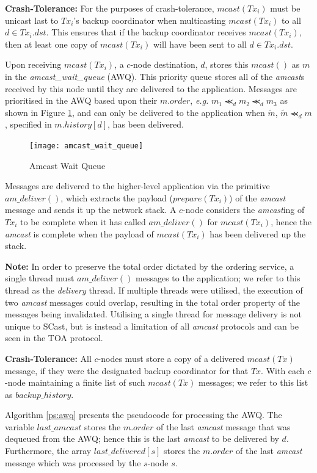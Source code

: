 \begin{enumerate}
        \textbf{Crash-Tolerance:} For the purposes of crash-tolerance, $mcast(Tx_i)$ must be unicast last to $Tx_i$'s backup coordinator when multicasting $mcast(Tx_i)$ to all $d \in Tx_i.dst$.  This ensures that if the backup coordinator receives $mcast(Tx_i)$, then at least one copy of $mcast(Tx_i)$ will have been sent to all $d \in Tx_i.dst$.  
        \endleftbar
        
        \leftbar
        Upon receiving $mcast(Tx_i)$, a $c$-node destination, $d$, stores this $mcast()$ as $m$ in the \emph{amcast\_wait\_queue} (AWQ).  This priority queue stores all of the \emph{amcast}s received by this node until they are delivered to the application.  Messages are prioritised in the AWQ based upon their $m.order$, \emph{e.g.} $m_1 \llcurly_d m_2 \llcurly_d m_3$ as shown in Figure \ref{fig:awq}, and can only be delivered to the application when $\tilde{m}$, $\tilde{m} \llcurly_d m$, specified in $m.history[d]$, has been delivered.  
        
         \begin{figure}[H] 
        \centering    
         \texttt{[image: amcast\_wait\_queue]}
         \caption[Amcast Wait Queue]{Amcast Wait Queue}
         \label{fig:awq}
    \end{figure}             
        \vspace{-2em}
        Messages are delivered to the higher-level application via the primitive $am\_deliver()$, which extracts the payload ($prepare(Tx_i)$) of the \emph{amcast} message and sends it up the network stack.  A $c$-node considers the \emph{amcast}ing of $Tx_i$ to be complete when it has called $am\_deliver()$ for $mcast(Tx_i)$, hence the \emph{amcast} is complete when the payload of $mcast(Tx_i)$ has been delivered up the stack.  
        
        \textbf{Note:} In order to preserve the total order dictated by the ordering service, a single thread must $am\_deliver()$ messages to the application; we refer to this thread as the \emph{delivery} thread.  If multiple threads were utilised, the execution of two \emph{amcast} messages could overlap, resulting in the total order property of the messages being invalidated.  Utilising a single thread for message delivery is not unique to \textsf{SCast}, but is instead a limitation of all \emph{amcast} protocols and can be seen in the TOA protocol.    
        
        \textbf{Crash-Tolerance:} All $c$-nodes must store a copy of a delivered $mcast(Tx)$ message, if they were the designated backup coordinator for that $Tx$.  With each $c$-node maintaining a finite list of such $mcast(Tx)$ messages; we refer to this list as $backup\_history$.  
        \endleftbar

        Algorithm \ref{ps:awq} presents the pseudocode for processing the AWQ.  The variable $last\_amcast$ stores the $m.order$ of the last \emph{amcast} message that was dequeued from the AWQ; hence this is the last \emph{amcast} to be delivered by $d$.  Furthermore, the array $last\_delivered[s]$ stores the $m.order$ of the last \emph{amcast} message which was processed by the $s$-node $s$.  
    
    \end{enumerate}
